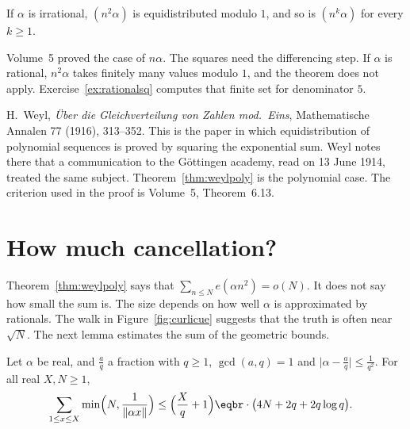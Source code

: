 \begin{corollary}\label{cor:nsquared}
If $\alpha$ is irrational, $(n^2\alpha)$ is equidistributed modulo $1$, and so is $(n^k\alpha)$ for every $k\ge1$.
\end{corollary}

Volume~5 proved the case of $n\alpha$. The squares need the differencing step. If $\alpha$ is rational, $n^2\alpha$ takes finitely many values modulo $1$, and the theorem does not apply. Exercise~\ref{ex:rationalsq} computes that finite set for denominator $5$.

\begin{remark}[Weyl, 1916]
H.~Weyl, \emph{Über die Gleichverteilung von Zahlen mod.\ Eins}, Mathematische Annalen 77 (1916), 313--352. This is the paper in which equidistribution of polynomial sequences is proved by squaring the exponential sum. Weyl notes there that a communication to the Göttingen academy, read on 13 June 1914, treated the same subject. Theorem~\ref{thm:weylpoly} is the polynomial case. The criterion used in the proof is Volume~5, Theorem~6.13.
\end{remark}

\section{How much cancellation?}

Theorem~\ref{thm:weylpoly} says that $\sum_{n\le N}e(\alpha n^2)=o(N)$. It does not say how small the sum is. The size depends on how well $\alpha$ is approximated by rationals. The walk in Figure~\ref{fig:curlicue} suggests that the truth is often near $\sqrt N$. The next lemma estimates the sum of the geometric bounds.

\begin{lemma}\label{lem:summin}
Let $\alpha$ be real, and $\frac aq$ a fraction with $q\ge1$, $\gcd(a,q)=1$ and $\bigl|\alpha-\frac aq\bigr|\le\frac1{q^2}$. For all real $X,N\ge1$,
\[
\begin{aligned}\sum_{1\le x\le X}\min\Bigl(N,\frac1{\|\alpha x\|}\Bigr)&\le\Bigl(\frac Xq+1\Bigr)\eqbr\cdot\bigl(4N+2q+2q\log q\bigr).\end{aligned}
\]
\end{lemma}

